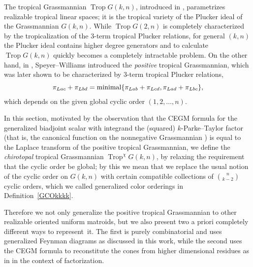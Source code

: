 \documentclass[pdftex]{sigma}
\theoremstyle{definition}
\def \min {{\rm minimal}}
\numberwithin{equation}{section}
\begin{document}
The tropical Grassmannian $\operatorname{Trop} G(k,n)$, introduced in \cite{speyer2004tropical}, parametrizes realizable tropical linear spaces; it is the tropical variety of the Plucker ideal of the Grassmannian $G(k,n)$. While $\operatorname{Trop} G(2,n)$ is completely characterized by the tropicalization of the 3-term tropical Plucker relations, for general $(k,n)$ the Plucker ideal contains higher degree generators and to calculate $\operatorname{Trop} G(k,n)$ quickly becomes a completely intractable problem. On the other hand, in \cite{speyer2005tropical}, Speyer--Williams introduced the \textit{positive} tropical Grassmannian, which was later shown \cite{Arkani-Hamed:2020cig,speyer2021positive} to be characterized by 3-term tropical Plucker relations,
\[\pi_{Lac} + \pi_{Lbd} = \min \{\pi_{Lab} + \pi_{Lcd},\pi_{Lad} + \pi_{Lbc}\},\]
which depends on the given global cyclic order $(1,2,\dots, n)$.

In this section, motivated by the observation that the CEGM formula for the generalized biadjoint scalar with integrand the (squared) $k$-Parke--Taylor factor (that is, the canonical function on the nonnegative Grassmannian \cite{Arkani-Hamed:2012zlh}) is equal to the Laplace transform of the positive tropical Grassmannian, we define the \textit{chirotopal} tropical Grassmannian $\operatorname{Trop}^\chi G(k,n)$, by relaxing the requirement that the cyclic order be global; by this we mean that we replace the usual notion of the cyclic order on $G(k,n)$ with certain compatible collections of $\binom{n}{k-2}$ cyclic orders, which we called generalized color orderings in Definition~\ref{GCOkkkk}.

Therefore we not only generalize the positive tropical Grassmannian to other realizable oriented uniform matroids, but we also present two a priori completely different ways to represent~it. The first is purely combinatorial and uses generalized Feynman diagrams as discussed in this work, while the second uses the CEGM formula to reconstitute the cones from higher dimensional residues as in \cite{Early:2022mdn} in the context of factorization.
\end{document}
